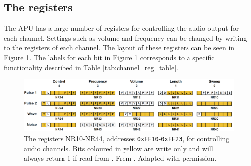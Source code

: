 \subsection{The registers}
    The APU has a large number of registers for controlling the audio output for each channel. Settings such as volume and frequency can be changed by writing to the registers of each channel. The layout of these registers can be seen in Figure \ref{fig:apu_channel_registers}. The labels for each bit in Figure \ref{fig:apu_channel_registers} corresponds to a specific functionality described in Table \ref{tab:channel_reg_table}.

    \begin{figure}[H]
        \centering
        \includegraphics[width=\linewidth]{figures/APU/apu_channel_registers.png}
        \caption{The registers NR10-NR44, addresses \texttt{0xFF10}-\texttt{0xFF23}, for controlling audio channels. Bits coloured in yellow are write only and will always return 1 if read from \cite{AudioHardware}. From \cite{ultimateGBtalkSlides}. Adapted with permission. }
        \label{fig:apu_channel_registers}
    \end{figure}
    
